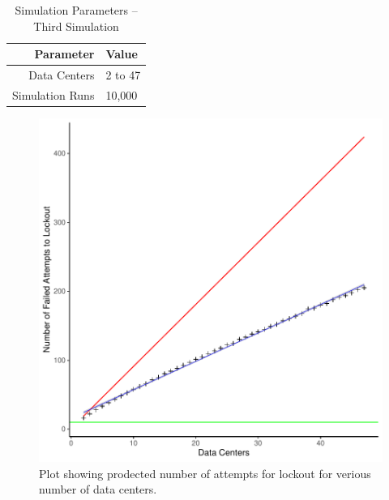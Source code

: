 \documentclass[11pt, letterpaper]{article}
\begin{document}
\begin{table}[H]
	\centering
	\caption{Simulation Parameters -- Third Simulation}
	\begin{tabular}{||r|l||}
		\hline \hline
		Parameter & Value \\ \hline \hline
		Data Centers & 2 to 47 \\ \hline
		Simulation Runs & 10,000 \\ \hline \hline
	\end{tabular}
	\label{tab:Sim3_set}
\end{table}



\begin{figure}[H]
\centering
\includegraphics{Report-007}
	\caption{Plot showing prodected number of attempts for lockout for verious
	number of data centers.}
	\label{fig:hist_3}
\end{figure}
\end{document}
